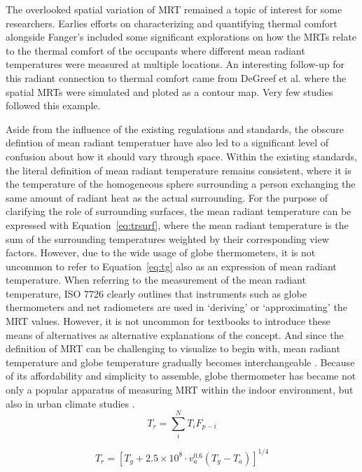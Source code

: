     The overlooked spatial variation of MRT remained a topic of interest for some researchers. Earlies efforts on characterizing and quantifying thermal comfort alongside Fanger's included some significant explorations on how the MRTs relate to the thermal comfort of the occupants where different mean radiant temperatures were measured at multiple locations. An interesting follow-up for this radiant connection to thermal comfort came from DeGreef et al. where the spatial MRTs were simulated and ploted as a contour map\cite{degreef_simplified_1998}. Very few studies followed this example. 

    Aside from the influence of the existing regulations and standards, the obscure defintion of mean radiant temperatuer have also led to a significant level of confusion about how it should vary through space. Within the existing standards, the literal definition of mean radiant temperature remains consistent, where it is the temperature of the homogeneous sphere surrounding a person exchanging the same amount of radiant heat as the actual surrounding. For the purpose of clarifying the role of surrounding surfaces, the mean radiant temperature can be expressed with Equation~\ref{eq:trsurf}, where the mean radiant temperature is the sum of the surrounding temperatures weighted by their corresponding view factors. However, due to the wide usage of globe thermometers, it is not uncommon to refer to Equation~\ref{eq:tg} also as an expression of mean radiant temperature\cite{graves_globe_1974}. 
    When referring to the measurement of the mean radiant temperature, ISO 7726 clearly outlines that instruments such as globe thermometers and net radiometers are used in `deriving' or `approximating' the MRT values. However, it is not uncommon for textbooks to introduce these means of alternatives as alternative explanations of the concept. And since the definition of MRT can be challenging to visualize to begin with, mean radiant temperature and globe temperature gradually becomes interchangeable \cite{kantor_most_2011}. Because of its affordability and simplicity to assemble, globe thermometer has became not only a popular apparatus of measuring MRT within the indoor environment, but also in urban climate studies \cite{thorsson_different_2007}. 
    \begin{equation}
    T_r = \sum_i^N T_i F_{p-i} \label{eq:trsurf}
    \end{equation}

    \begin{equation}
    T_r = [T_g + 2.5\times 10^8 \cdot v_a^{0.6}(T_g-T_a)]^{1/4}\label{eq:tg}
    \end{equation}

